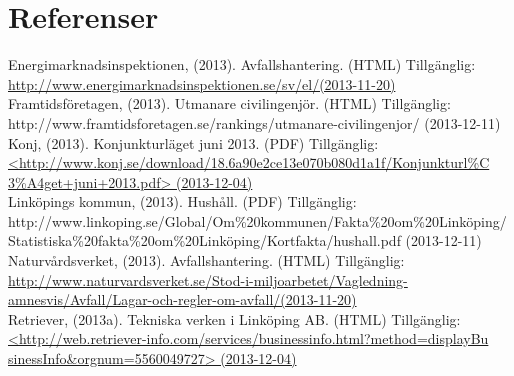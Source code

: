 \documentclass[10pt,a4paper]{article}
\begin{document}
\newpage
\section{Referenser}


\hspace{0,5cm}Energimarknadsinspektionen, (2013). Avfallshantering. (HTML) Tillgänglig: \\
\hyperref{http://www.energimarknadsinspektionen.se/sv/el/}{}{}{http://www.energimarknadsinspektionen.se/sv/el/(2013-11-20)}\\

Framtidsföretagen, (2013). Utmanare civilingenjör. (HTML) Tillgänglig: \\
http://www.framtidsforetagen.se/rankings/utmanare-civilingenjor/ (2013-12-11)\\

Konj, (2013). Konjunkturläget juni 2013. (PDF) Tillgänglig:\\
\hyperref{http://www.konj.se/download/18.6a90e2ce13e070b080d1a1f/Konjunkturl\%C3\%A4get+juni+2013.pdf}{}{}{<http://www.konj.se/download/18.6a90e2ce13e070b080d1a1f/Konjunkturl\%C\\3\%A4get+juni+2013.pdf> (2013-12-04)}\\

Linköpings kommun, (2013). Hushåll. (PDF) Tillgänglig:\\
http://www.linkoping.se/Global/Om\%20kommunen/Fakta\%20om\%20Linköping/\\Statistiska\%20fakta\%20om\%20Linköping/Kortfakta/hushall.pdf (2013-12-11)\\

Naturvårdsverket, (2013). Avfallshantering. (HTML) Tillgänglig: \\
\hyperref{http://www.naturvardsverket.se/Stod-i-miljoarbetet/Vagledning-amnesvis/Avfall/Lagar-och-regler-om-avfall/}{}{}{http://www.naturvardsverket.se/Stod-i-miljoarbetet/Vagledning-amnesvis/Avfall/Lagar-och-regler-om-avfall/(2013-11-20)}\\

Retriever, (2013a). Tekniska verken i Linköping AB. (HTML) Tillgänglig: \\
\hyperref{http://web.retriever-info.com/services/businessinfo.html?method=displayBusinessInfo\&orgnum=5560049727}{}{}{<http://web.retriever-info.com/services/businessinfo.html?method=displayBu\\sinessInfo\&orgnum=5560049727> (2013-12-04)}\\
\end{document}
